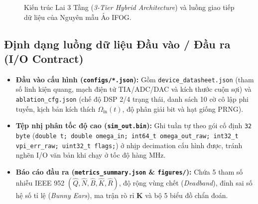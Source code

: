 \documentclass[11pt, a4paper]{article}
\begin{document}
\begin{figure}[htbp]
\caption{Kiến trúc Lai 3 Tầng (\emph{3-Tier Hybrid Architecture}) và luồng giao tiếp dữ liệu của Nguyên mẫu Ảo IFOG.}
\label{fig:3tier_arch}
\end{figure}

\subsection*{Định dạng luồng dữ liệu Đầu vào / Đầu ra (I/O Contract)}
\begin{itemize}
    \item \textbf{Đầu vào cấu hình (\texttt{configs/*.json}):} Gồm \texttt{device\_datasheet.json} (tham số linh kiện quang, mạch điện tử TIA/ADC/DAC và kích thước cuộn sợi) và \texttt{ablation\_cfg.json} (chế độ DSP 2/4 trạng thái, danh sách 10 cờ cô lập phi tuyến, kịch bản kích thích $\Omega_{\text{in}}(t)$, độ phân giải bit và hạt giống PRNG).
    \item \textbf{Tệp nhị phân tốc độ cao (\texttt{sim\_out.bin}):} Ghi tuần tự theo gói cố định \texttt{32 byte} (\texttt{double t; double omega\_in; int64\_t omega\_out\_raw; int32\_t vpi\_err\_raw; uint32\_t flags;}) ở nhịp decimation cấu hình được, tránh nghẽn I/O văn bản khi chạy ở tốc độ hàng MHz.
    \item \textbf{Báo cáo đầu ra (\texttt{metrics\_summary.json} \& \texttt{figures/}):} Chứa 5 tham số nhiễu IEEE 952 $(\hat{Q}, \hat{N}, \hat{B}, \hat{K}, \hat{R})$, độ rộng vùng chết (\emph{Deadband}), đỉnh sai số hệ số tỉ lệ (\emph{Bunny Ears}), ma trận rò rỉ $\mathbf{K}$ và bộ 5 biểu đồ chẩn đoán.
\end{itemize}

\end{document}
